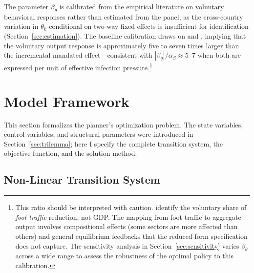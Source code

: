 \documentclass[12pt, a4paper]{article}
\begin{document}
The parameter $\beta_\theta$ is calibrated from the empirical literature on voluntary behavioral responses rather than estimated from the panel, as the cross-country variation in $\theta_k$ conditional on two-way fixed effects is insufficient for identification (Section~\ref{sec:estimation}). The baseline calibration draws on \citet{goolsbee2021} and \citet{born2021}, implying that the voluntary output response is approximately five to seven times larger than the incremental mandated effect---consistent with $|\beta_\theta|/\alpha_S \approx 5$--$7$ when both are expressed per unit of effective infection pressure.\footnote{This ratio should be interpreted with caution. \citet{goolsbee2021} identify the voluntary share of \textit{foot traffic} reduction, not GDP. The mapping from foot traffic to aggregate output involves compositional effects (some sectors are more affected than others) and general equilibrium feedbacks that the reduced-form specification does not capture. The sensitivity analysis in Section~\ref{sec:sensitivity} varies $\beta_\theta$ across a wide range to assess the robustness of the optimal policy to this calibration.}
\section{Model Framework}
\label{sec:model}

This section formalizes the planner's optimization problem. The state variables,
control variables, and structural parameters were introduced in
Section~\ref{sec:trilemma}; here I specify the complete transition system, the
objective function, and the solution method.

\subsection{Non-Linear Transition System}
\label{sec:nonlinear}
\end{document}
